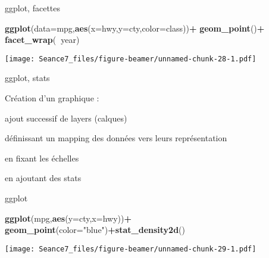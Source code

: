 \documentclass[ignorenonframetext,]{beamer}
\newenvironment{Shaded}{\begin{snugshade}}{\end{snugshade}}
\newcommand{\DataTypeTok}[1]{\textcolor[rgb]{0.13,0.29,0.53}{#1}}
\newcommand{\KeywordTok}[1]{\textcolor[rgb]{0.13,0.29,0.53}{\textbf{#1}}}
\newcommand{\NormalTok}[1]{#1}
\newcommand{\OperatorTok}[1]{\textcolor[rgb]{0.81,0.36,0.00}{\textbf{#1}}}
\newcommand{\StringTok}[1]{\textcolor[rgb]{0.31,0.60,0.02}{#1}}
\begin{document}
\begin{frame}[fragile]{{ggplot, facettes}}
\protect\hypertarget{ggplot-facettes-1}{}

\begin{Shaded}
\begin{Highlighting}[]
\KeywordTok{ggplot}\NormalTok{(}\DataTypeTok{data=}\NormalTok{mpg,}\KeywordTok{aes}\NormalTok{(}\DataTypeTok{x=}\NormalTok{hwy,}\DataTypeTok{y=}\NormalTok{cty,}\DataTypeTok{color=}\NormalTok{class))}\OperatorTok{+}
\StringTok{  }\KeywordTok{geom_point}\NormalTok{()}\OperatorTok{+}
\StringTok{  }\KeywordTok{facet_wrap}\NormalTok{(}\OperatorTok{~}\NormalTok{year)}
\end{Highlighting}
\end{Shaded}

\texttt{[image: Seance7\_files/figure-beamer/unnamed-chunk-28-1.pdf]}

\end{frame}

\begin{frame}{{ggplot, stats}}
\protect\hypertarget{ggplot-stats}{}

Création d'un graphique :

ajout successif de layers (calques)

définissant un mapping des données vers leurs représentation

en fixant les échelles

en ajoutant des stats

\end{frame}

\begin{frame}[fragile]{ggplot}
\protect\hypertarget{ggplot-7}{}

\begin{Shaded}
\begin{Highlighting}[]
\KeywordTok{ggplot}\NormalTok{(mpg,}\KeywordTok{aes}\NormalTok{(}\DataTypeTok{y=}\NormalTok{cty,}\DataTypeTok{x=}\NormalTok{hwy))}\OperatorTok{+}
\StringTok{  }\KeywordTok{geom_point}\NormalTok{(}\DataTypeTok{color=}\StringTok{"blue"}\NormalTok{)}\OperatorTok{+}\KeywordTok{stat_density2d}\NormalTok{()}
\end{Highlighting}
\end{Shaded}

\texttt{[image: Seance7\_files/figure-beamer/unnamed-chunk-29-1.pdf]}

\end{frame}
\end{document}
